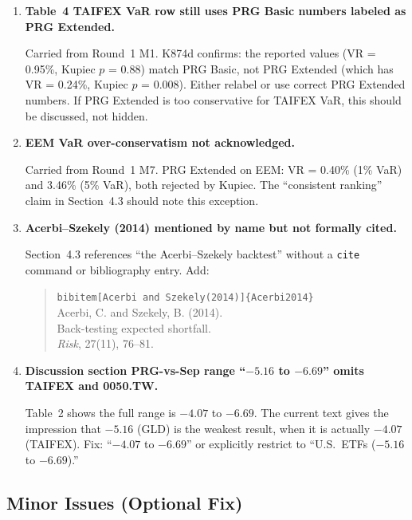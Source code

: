 \documentclass[12pt,a4paper]{article}
\begin{document}
\begin{enumerate}[label=\textbf{M\arabic*}]

\item \textbf{Table~4 TAIFEX VaR row still uses PRG Basic numbers labeled as PRG Extended.}

Carried from Round~1 M1. K874d confirms: the reported values (VR = 0.95\%, Kupiec $p$ = 0.88) match PRG Basic, not PRG Extended (which has VR = 0.24\%, Kupiec $p$ = 0.008). Either relabel or use correct PRG Extended numbers. If PRG Extended is too conservative for TAIFEX VaR, this should be discussed, not hidden.

\item \textbf{EEM VaR over-conservatism not acknowledged.}

Carried from Round~1 M7. PRG Extended on EEM: VR = 0.40\% (1\% VaR) and 3.46\% (5\% VaR), both rejected by Kupiec. The ``consistent ranking'' claim in Section~4.3 should note this exception.

\item \textbf{Acerbi--Szekely (2014) mentioned by name but not formally cited.}

Section~4.3 references ``the Acerbi--Szekely backtest'' without a \texttt{cite} command or bibliography entry. Add:

\begin{quote}
\small
\texttt{bibitem[Acerbi and Szekely(2014)]\{Acerbi2014\}}\\
Acerbi, C. and Szekely, B. (2014).\\
Back-testing expected shortfall.\\
\emph{Risk}, 27(11), 76--81.
\end{quote}

\item \textbf{Discussion section PRG-vs-Sep range ``$-5.16$ to $-6.69$'' omits TAIFEX and 0050.TW.}

Table~2 shows the full range is $-4.07$ to $-6.69$. The current text gives the impression that $-5.16$ (GLD) is the weakest result, when it is actually $-4.07$ (TAIFEX). Fix: ``$-4.07$ to $-6.69$'' or explicitly restrict to ``U.S.\ ETFs ($-5.16$ to $-6.69$).''

\end{enumerate}

\subsection*{Minor Issues (Optional Fix)}
\end{document}
